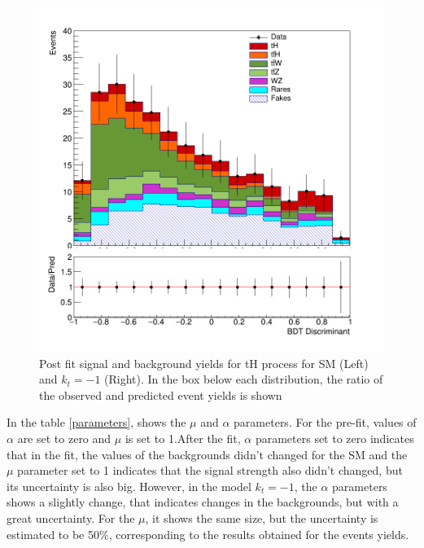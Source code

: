\begin{figure}[!htbp]
\begin{minipage}[b]{0.48\textwidth}
		\includegraphics[width=\textwidth]{Chapter4/simple-kt-1.png}
	\end{minipage}
	\caption{Post fit signal and background yields for tH process for SM (Left) and $k_t=-1$ (Right).
		In the box below each distribution, the ratio of the observed and predicted event yields is shown}
\label{simple}
\end{figure}
In the table \ref{parameters}, shows the $\mu$ and $\alpha$ parameters. For the pre-fit, values of $\alpha$ are set to zero and $\mu$ is set to 1.After the fit,  $\alpha$ parameters set to zero indicates that in the fit, the values of the backgrounds didn't changed for the SM and the $\mu$ parameter set to 1 indicates that the signal strength also didn't changed, but its uncertainty is also big.
However, in the model $k_t=-1$, the $\alpha$ parameters shows a slightly change, that indicates changes in the backgrounds, but with a great uncertainty. For the $\mu$, it shows the same size, but the uncertainty is estimated to be 50$\%$, corresponding to the results obtained for the events yields.
